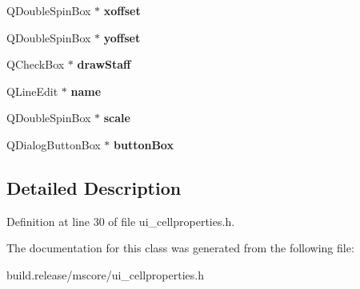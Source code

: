 \begin{DoxyCompactItemize}
\mbox{\label{class_ui___palette_cell_properties_abbc2a011cec0158f420473049aaf5d1e}} 
Q\+Double\+Spin\+Box $\ast$ {\bfseries xoffset}
\item 
\mbox{\label{class_ui___palette_cell_properties_ac61240b247c0b86bfa00a2be56dc9a05}} 
Q\+Double\+Spin\+Box $\ast$ {\bfseries yoffset}
\item 
\mbox{\label{class_ui___palette_cell_properties_a22ad2d748f1bfd97fb9bfff2cb2db80a}} 
Q\+Check\+Box $\ast$ {\bfseries draw\+Staff}
\item 
\mbox{\label{class_ui___palette_cell_properties_ad6204599440510332bcd89cd4a900c64}} 
Q\+Line\+Edit $\ast$ {\bfseries name}
\item 
\mbox{\label{class_ui___palette_cell_properties_ab6d44c267980610479350720a12a5dd0}} 
Q\+Double\+Spin\+Box $\ast$ {\bfseries scale}
\item 
\mbox{\label{class_ui___palette_cell_properties_a285fd8827b9fe3c59d0823dda9d97d0c}} 
Q\+Dialog\+Button\+Box $\ast$ {\bfseries button\+Box}
\end{DoxyCompactItemize}


\subsection{Detailed Description}


Definition at line 30 of file ui\+\_\+cellproperties.\+h.



The documentation for this class was generated from the following file\+:\begin{DoxyCompactItemize}
\item 
build.\+release/mscore/ui\+\_\+cellproperties.\+h\end{DoxyCompactItemize}
